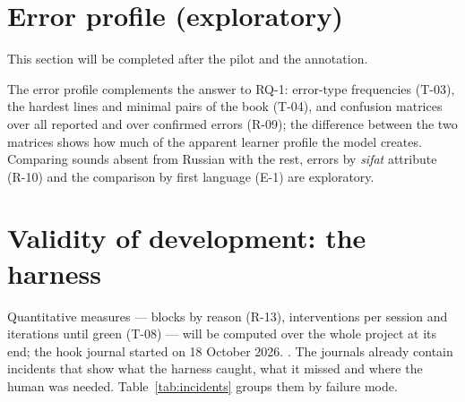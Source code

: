 \section{Error profile (exploratory)}\label{sec:eval-profile}

\begin{notebox}
This section will be completed after the pilot and the annotation.
\end{notebox}

The error profile complements the answer to RQ-1: error-type frequencies (T-03), the hardest lines and minimal
pairs of the book (T-04), and confusion matrices over all reported and over confirmed errors (R-09); the
difference between the two matrices shows how much of the apparent learner profile the model creates. Comparing
sounds absent from Russian with the rest, errors by \emph{sifat} attribute (R-10) and the comparison by first
language (E-1) are exploratory.

\section{Validity of development: the harness}\label{sec:eval-harness}

Quantitative measures --- blocks by reason (R-13), interventions per session and iterations until green
(T-08) --- will be computed over the whole project at its end; the hook journal started on 18 October 2026.
. The journals already contain incidents that show what the harness caught, what it
missed and where the human was needed. Table~\ref{tab:incidents} groups them by failure mode.

